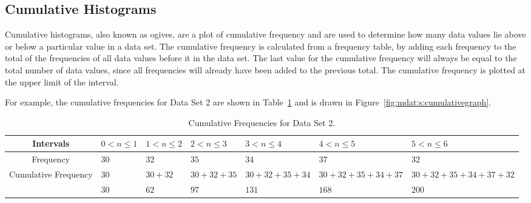 \subsection{Cumulative Histograms}
Cumulative histograms, also known as ogives, are a plot of cumulative frequency and are used to determine how many data values lie above or below a particular value in a data set. The cumulative frequency is calculated from a frequency table, by adding each frequency to the total of the frequencies of all data values before it in the data set. The last value for the cumulative frequency will always be equal to the total number of data values, since all frequencies will already have been added to the previous total. The cumulative frequency is plotted at the upper limit of the interval.

For example, the cumulative frequencies for Data Set 2 are shown in Table~\ref{tab:mdat:s:cumulativeds2} and is drawn in Figure~\ref{fig:mdat:s:cumulativegraph}.

\begin{table}[htb]
\begin{center}
\begin{tabular}{|c||p{1.5cm}|p{1.5cm}|p{1.5cm}|p{1.5cm}|p{1.5cm}|p{1.5cm}|}\hline
Intervals & $0<n\leq 1 $ & $1<n\leq 2 $ & $2<n\leq 3 $ & $3<n\leq 4 $ & $4<n\leq 5$ & $5<n\leq 6 $ \\ 
\hline
Frequency & $30$ &$32$ &$35$ &$34$ &$37$ &$32$\\
\hline
Cumulative Frequency & $30$ &$30 + 32$ &$30 + 32 + 35$ &$30 + 32 + 35 + 34$ &$30 + 32 + 35 + 34 + 37 $&$30 + 32 + 35 + 34 + 37 + 32$\\
\hline
& $30$ &$ 62$ & $97$ & $131$ & $168$ & $200$\\
\hline
\end{tabular}
\caption{Cumulative Frequencies for Data Set 2. \label{tab:mdat:s:cumulativeds2}}
\end{center}
\end{table}

